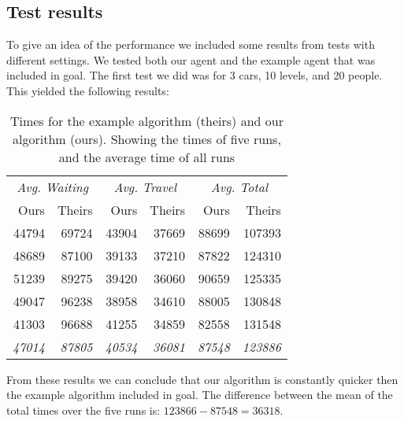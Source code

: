 \documentclass[a4paper,10pt,twocolumn]{article}
\begin{document}
\subsection{Test results}
To give an idea of the performance we included some results from tests with different settings. We tested both our agent and the example agent that was included in goal. The first test we did was for 3 cars, 10 levels, and 20 people. This yielded the following results:
\begin{table}[ht]
 \begin{tabular}{rr|rr|rr}
  \hline
  \multicolumn{2}{c|}{\emph{Avg. Waiting}} & \multicolumn{2}{c|}{\emph{Avg. Travel}} & \multicolumn{2}{c}{\emph{Avg. Total}}\\
  Ours		& Theirs	& Ours 		& Theirs & Ours & Theirs \\
  \hline
  44794 & 69724 & 43904 & 37669 & 88699 & 107393 \\
  48689 & 87100 & 39133 & 37210 & 87822	& 124310 \\
  51239 & 89275	& 39420 & 36060	& 90659 & 125335 \\
  49047 & 96238 & 38958 & 34610 & 88005 & 130848 \\
  41303 & 96688	& 41255 & 34859	& 82558 & 131548 \\
  \hline
  \emph{47014} & \emph{87805} & \emph{40534} & \emph{36081} & \emph{87548} & \emph{123886}\\  
\hline

 \end{tabular}
 \caption{Times for the example algorithm (theirs) and our algorithm (ours). Showing the times of five runs, and the average time of all runs}
 \label{tbl:3car_10lev_20pop_results}
\end{table}

From these results we can conclude that our algorithm is constantly quicker then the example algorithm included in goal. The difference between the mean of the total times over the five runs is: $123866 - 87548 = 36318$.
\end{document}
